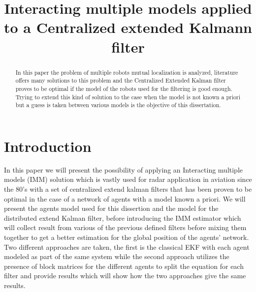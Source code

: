 \documentclass[conference]{IEEEtran}
\begin{document}
\title{   Interacting multiple models applied to a Centralized extended Kalmann filter  \\
}

\author{

}

\renewcommand{\headrulewidth}{0pt}


\maketitle
\thispagestyle{empty}
\pagestyle{plain}
\thispagestyle{fancy}

\begin{abstract}
In this paper the problem of multiple robots mutual localization is analyzed, literature offers many solutions to this problem and the Centralized Extended Kalman filter proves to be optimal if the model of the robots used for the filtering is good enough. Trying to extend this kind of solution to the case when the model is not known a priori but a guess is taken between various models is the objective of this dissertation. 
\end{abstract}

\section{Introduction}

In this paper we will present the possibility of applying an Interacting multiple models (IMM) solution which is vastly used for radar application in aviation since the 80's with a set of centralized extend kalman filters that has been proven to be optimal in the case of a network of agents with a model known a priori. We will present the agents model used for this dissertion and the model for the distributed extend Kalman filter, before introducing the IMM estimator which will collect result from various of the previous defined filters before mixing them together to get a better estimation for the global position of the agents' network. Two different approaches are taken, the first is the classical EKF with each agent modeled as part of the same system while the second approach utilizes the presence of block matrices for the different agents to split the equation for each filter and provide results which will show how the two approaches give the same results.
\end{document}
